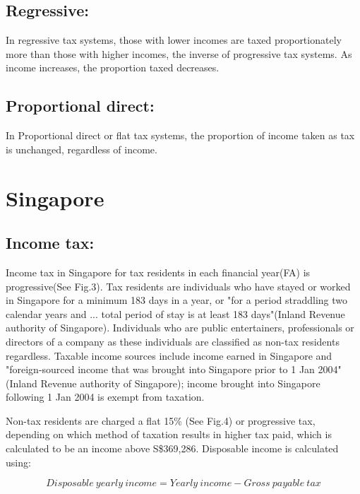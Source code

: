 \documentclass[12pt, a4paper]{article}
\begin{document}
	\subsection{Regressive:}
	In regressive tax systems, those with lower incomes are taxed proportionately more than those with higher incomes, the inverse of progressive tax systems. As income increases, the proportion taxed decreases.
	
	\subsection{Proportional direct:}
	In Proportional direct or flat tax systems, the proportion of income taken as tax is unchanged, regardless of income.
	\newpage
	\section{Singapore}
	\subsection{Income tax:}
	Income tax in Singapore for tax residents in each financial year(FA) is progressive(See Fig.3). Tax residents are individuals who have stayed or worked in Singapore for a minimum 183 days in a year, or "for a period straddling two calendar years and ... total period of stay is at least 183 days"(Inland Revenue authority of Singapore). Individuals who are public entertainers, professionals or directors of a company as these individuals are classified as non-tax residents regardless. Taxable income sources include income earned in Singapore and "foreign-sourced income that was brought into Singapore prior to 1 Jan 2004"(Inland Revenue authority of Singapore); income brought into Singapore following 1 Jan 2004 is exempt from taxation.
	\newline
	
	Non-tax residents are charged a flat 15\% (See Fig.4) or progressive tax, depending on which method of taxation results in higher tax paid, which is calculated to be an income above S\$369,286. Disposable income is calculated using:
	
	\begin{equation}
	Disposable \ yearly \ income = Yearly \ income - Gross \ payable \ tax
	\end{equation}
		
\end{document}
